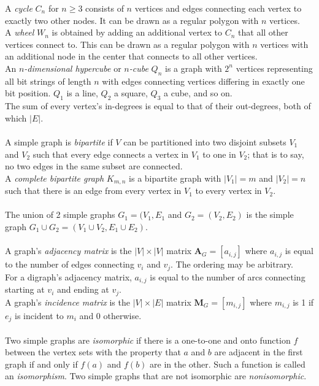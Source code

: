 \documentclass[12pt, A4, twocolumn]{article}
\begin{document}
		A \textit{cycle} \(C_n\) for \(n \ge 3\) consists of \(n\) vertices and edges connecting each vertex to exactly two other nodes. It can be drawn as a regular polygon with \(n\) vertices. \\
		A \textit{wheel} \(W_n\) is obtained by adding an additional vertex to \(C_n\) that all other vertices connect to. This can be drawn as a regular polygon with \(n\) vertices with an additional node in the center that connects to all other vertices. \\
		An \textit{\(n\)-dimensional hypercube} or \textit{\(n\)-cube} \(Q_n\) is a graph with \(2^n\) vertices representing all bit strings of length \(n\) with edges connecting vertices differing in exactly one bit position. \(Q_1\) is a line, \(Q_2\) a square, \(Q_3\) a cube, and so on. \\
		The sum of every vertex's in-degrees is equal to that of their out-degrees, both of which \(|E|\). \\\\
		A simple graph is \textit{bipartite} if \(V\) can be partitioned into two disjoint subsets \(V_1\) and \(V_2\) such that every edge connects a vertex in \(V_1\) to one in \(V_2\); that is to say, no two edges in the same subset are connected. \\
		A \textit{complete bipartite graph} \(K_{m, n}\) is a bipartite graph with \(|V_1| = m\) and \(|V_2| = n\) such that there is an edge from every vertex in \(V_1\) to every vertex in \(V_2\). \\\\
		The union of 2 simple graphs \(G_1 = (V_1, E_1\) and \(G_2 = (V_2, E_2)\) is the simple graph \(G_1 \cup G_2 = (V_1 \cup V_2, E_1 \cup E_2)\). \\\\
		A graph's \textit{adjacency matrix} is the \(|V| \times |V|\) matrix \(\textbf{A}_G = [a_{i, j}]\) where \(a_{i, j}\) is equal to the number of edges connecting \(v_i\) and \(v_j\). The ordering may be arbitrary. \\
		For a digraph's adjacency matrix, \(a_{i, j}\) is equal to the number of arcs connecting starting at \(v_i\) and ending at \(v_j\). \\
		A graph's \textit{incidence matrix} is the \(|V| \times |E|\) matrix \(\textbf{M}_G = [m_{i, j}]\) where \(m_{i, j}\) is 1 if \(e_j\) is incident to \(m_i\) and 0 otherwise. \\\\
		Two simple graphs are \textit{isomorphic} if there is a one-to-one and onto function \(f\) between the vertex sets with the property that \(a\) and \(b\) are adjacent in the first graph if and only if \(f(a)\) and \(f(b)\) are in the other. Such a function is called an \textit{isomorphism}. Two simple graphs that are not isomorphic are \textit{nonisomorphic}. \\\\
\end{document}
